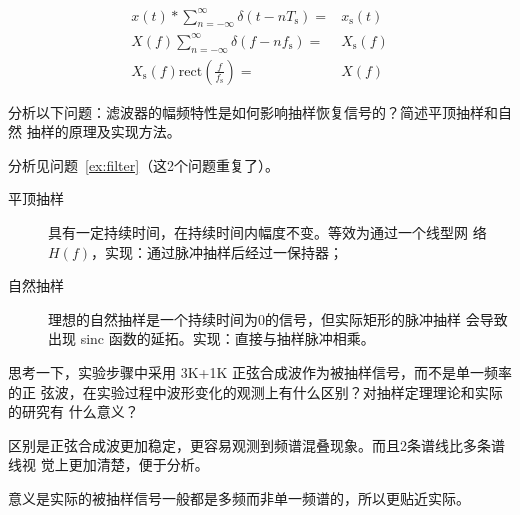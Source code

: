 \documentclass[../main]{subfiles}
\begin{document}
\begin{align}
  x(t) * \sum^\infty_{n = -\infty} \delta(t - nT_\mathrm{s}) = & x_\mathrm{s}(t)\\
  X(f) \sum^\infty_{n = -\infty} \delta(f - nf_\mathrm{s}) = & X_\mathrm{s}(f)\\
  X_\mathrm{s}(f) \mathrm{rect}(\frac{f}{f_\mathrm{s}}) = & X(f)
\end{align}

\begin{Exercise}
  分析以下问题：滤波器的幅频特性是如何影响抽样恢复信号的？简述平顶抽样和自然
  抽样的原理及实现方法。
\end{Exercise}

\begin{Answer}
  分析见问题~\ref{ex:filter}（这2个问题重复了）。
\end{Answer}

\begin{description}
  \item[平顶抽样]具有一定持续时间，在持续时间内幅度不变。等效为通过一个线型网
    络$H(f)$，实现：通过脉冲抽样后经过一保持器；
  \item[自然抽样]理想的自然抽样是一个持续时间为0的信号，但实际矩形的脉冲抽样
    会导致出现 sinc 函数的延拓。实现：直接与抽样脉冲相乘。
\end{description}

\begin{Exercise}
  思考一下，实验步骤中采用 3K+1K 正弦合成波作为被抽样信号，而不是单一频率的正
  弦波，在实验过程中波形变化的观测上有什么区别？对抽样定理理论和实际的研究有
  什么意义？
\end{Exercise}

\begin{Answer}
  区别是正弦合成波更加稳定，更容易观测到频谱混叠现象。而且2条谱线比多条谱线视
  觉上更加清楚，便于分析。

  意义是实际的被抽样信号一般都是多频而非单一频谱的，所以更贴近实际。
\end{Answer}
\end{document}
